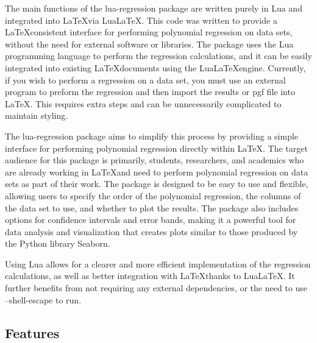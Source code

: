 \documentclass[11pt]{article}
\begin{document}
    The main functions of the {\ttfamily lua-regression} package are written purely in Lua and integrated into \LaTeX via Lua\LaTeX.
    This code was written to provide a \LaTeX consistent interface for performing polynomial regression on data sets, without the need for external software or libraries.
    The package uses the Lua programming language to perform the regression calculations, and it can be easily integrated into existing \LaTeX documents using the Lua\LaTeX engine.
    Currently, if you wish to perform a regression on a data set, you must use an external program to preform the regression and then import the results or pgf file into \LaTeX.
    This requires extra steps and can be unnecessarily complicated to maintain styling.

    The {\ttfamily lua-regression} package aims to simplify this process by providing a simple interface for performing polynomial regression directly within \LaTeX.
    The target audience for this package is primarily, students, researchers, and academics who are already working in \LaTeX and need to perform polynomial regression on data sets as part of their work.
    The package is designed to be easy to use and flexible, allowing users to specify the order of the polynomial regression, the columns of the data set to use, and whether to plot the results.
    The package also includes options for confidence intervals and error bands, making it a powerful tool for data analysis and visualization that creates plots similar to those produced by the Python library {\ttfamily Seaborn}.

    Using Lua allows for a clearer and more efficient implementation of the regression calculations, as well as better integration with \LaTeX thanks to Lua\LaTeX.
    It further benefits from not requiring any external dependencies, or the need to use {\ttfamily --shell-escape} to run.

    \subsection{Features}
\end{document}
